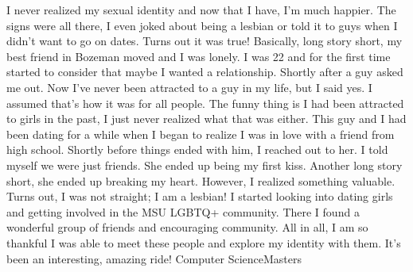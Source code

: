 {I never realized my sexual identity and now that I have, I’m much happier. 
The signs were all there, I even joked about being a lesbian or told it to 
guys when I didn’t want to go on dates. Turns out it was true! Basically, long 
story short, my best friend in Bozeman moved and I was lonely. I was 22 and for
the first time started to consider that maybe I wanted a relationship. Shortly 
after a guy asked me out. Now I’ve never been attracted to a guy in my life, 
but I said yes. I assumed that’s how it was for all people. The funny thing is 
I had been attracted to girls in the past, I just never realized what that was 
either. This guy and I had been dating for a while when I began to realize I 
was in love with a friend from high school. Shortly before things ended with 
him, I reached out to her. I told myself we were just friends. She ended up 
being my first kiss. Another long story short, she ended up breaking my heart. 
However, I realized something valuable. Turns out, I was not straight; I am a 
lesbian! I started looking into dating girls and getting involved in the MSU 
LGBTQ+ community. There I found a wonderful group of friends and encouraging 
community. All in all, I am so thankful I was able to meet these people and 
explore my identity with them. It’s been an interesting, amazing ride!}
{\she}{Computer Science}{Masters}
{\lesbianflagstory}
